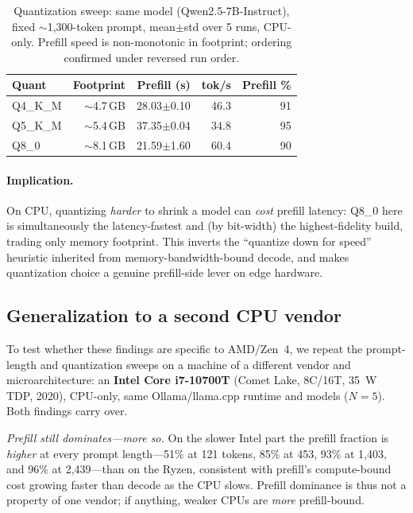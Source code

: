\documentclass[sigconf,nonacm,10pt]{acmart}
\begin{document}
\begin{table}[t]
  \centering
  \caption{Quantization sweep: same model (Qwen2.5-7B-Instruct), fixed
  $\sim$1{,}300-token prompt, mean$\pm$std over 5 runs, CPU-only. Prefill
  speed is non-monotonic in footprint; ordering confirmed under reversed
  run order.}
  \label{tab:quant}
  \small
  \begin{tabular}{lrrrr}
    \toprule
    Quant & Footprint & Prefill (s) & tok/s & Prefill \% \\
    \midrule
    Q4\_K\_M & $\sim$4.7\,GB & 28.03$\pm$0.10 & 46.3 & 91 \\
    Q5\_K\_M & $\sim$5.4\,GB & 37.35$\pm$0.04 & 34.8 & 95 \\
    Q8\_0    & $\sim$8.1\,GB & 21.59$\pm$1.60 & 60.4 & 90 \\
    \bottomrule
  \end{tabular}
\end{table}

\paragraph{Implication.}
On CPU, quantizing \emph{harder} to shrink a model can \emph{cost} prefill
latency: Q8\_0 here is simultaneously the latency-fastest and (by bit-width)
the highest-fidelity build, trading only memory footprint. This inverts the
``quantize down for speed'' heuristic inherited from memory-bandwidth-bound
decode, and makes quantization choice a genuine prefill-side lever on edge
hardware.

\subsection{Generalization to a second CPU vendor}
\label{sec:results-intel}
To test whether these findings are specific to AMD/Zen~4, we repeat the
prompt-length and quantization sweeps on a machine of a different vendor and
microarchitecture: an \textbf{Intel Core i7-10700T} (Comet Lake, 8C/16T,
35~W TDP, 2020), CPU-only, same Ollama/llama.cpp runtime and models
($N{=}5$). Both findings carry over.

\emph{Prefill still dominates---more so.} On the slower Intel part the
prefill fraction is \emph{higher} at every prompt length---51\% at 121
tokens, 85\% at 453, 93\% at 1{,}403, and 96\% at 2{,}439---than on the
Ryzen, consistent with prefill's compute-bound cost growing faster than
decode as the CPU slows. Prefill dominance is thus not a property of one
vendor; if anything, weaker CPUs are \emph{more} prefill-bound.
\end{document}
